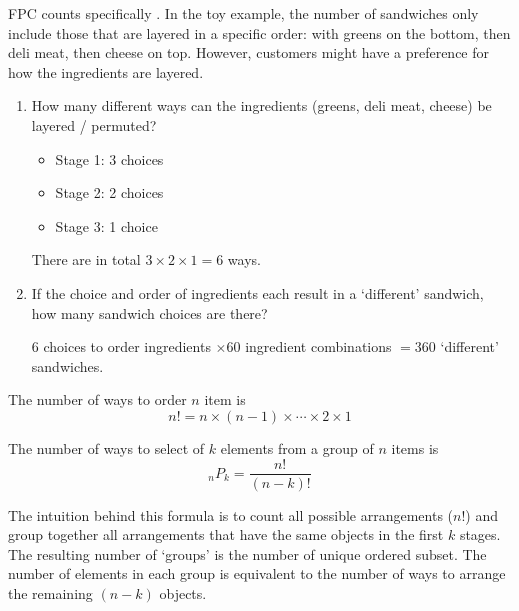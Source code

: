 \begin{example}
    FPC counts specifically . In the toy example, the number of sandwiches only include those that are layered in a specific order: with greens on the bottom, then deli meat, then cheese on top. However, customers might have a preference for how the ingredients are layered. 

    \begin{enumerate}[label=\alph*)]
        \item How many different ways can the ingredients (greens, deli meat, cheese) be layered / permuted?

        \begin{itemize}
            \item Stage 1: 3 choices
            \item Stage 2: 2 choices
            \item Stage 3: 1 choice
        \end{itemize}

        There are in total $3 \times 2 \times 1 = 6$ ways. 

        \item If the choice and order of ingredients each result in a `different' sandwich, how many sandwich choices are there?
        
        $6$ choices to order ingredients $\times 60$ ingredient combinations $= 360$ `different' sandwiches. 
    \end{enumerate}
\end{example}

\begin{definition}[Permutations - ${}_nP_n$]
    The number of ways to order $n$  item is $$n! = n \times (n - 1) \times \cdots \times 2 \times 1$$
\end{definition}

\begin{definition}[Permutations - ${}_nP_k$]
    The number of ways to select  of $k$ elements from a group of $n$  items is $${}_nP_k = \frac{n!}{(n-k)!}$$
\end{definition}

The intuition behind this formula is to count all possible arrangements ($n!$) and group together all arrangements that have the same objects in the first $k$ stages. The resulting number of `groups' is the number of unique ordered subset. The number of elements in each group is equivalent to the number of ways to arrange the remaining $(n - k)$ objects. 

